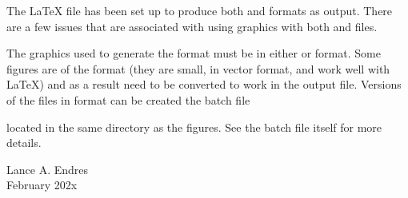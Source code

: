 The \LaTeX{} file has been set up to produce both  and  formats as output.  There are a few issues that are associated with using graphics with both  and  files.

The graphics used to generate the  format must be in either  or  format.  Some figures are of the  format (they are small, in vector format, and work well with \LaTeX) and as a result need to be converted to work in the  output file.  Versions of the  files in  format can be created the batch file 
	\begin{plainlist}
		\item {}
	\end{plainlist}
located in the same directory as the figures.  See the batch file itself for more details.

\vspace{\baselineskip}%
\noindent Lance A. Endres \\February 202x%